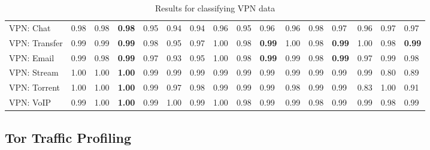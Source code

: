 \begin{table} [ht!]
{\begin{tabular} {|p{2cm}|p{0.7cm}p{0.7cm}p{0.7cm}|p{0.7cm}p{0.7cm}p{0.7cm}|p{0.7cm}p{0.7cm}p{0.7cm}|p{0.7cm}p{0.7cm}p{0.7cm}|p{0.7cm}p{0.7cm}p{0.7cm}|}
VPN: Chat & 0.98 & 0.98 & \textbf{0.98} & 0.95 & 0.94 & 0.94 & 0.96 & 0.95 & 0.96 & 0.96 & 0.98 & 0.97 & 0.96 & 0.97 & 0.97 \\
VPN: Transfer & 0.99 & 0.99 & \textbf{0.99} & 0.98 & 0.95 & 0.97 & 1.00 & 0.98 & \textbf{0.99} & 1.00 & 0.98 & \textbf{0.99} & 1.00 & 0.98 & \textbf{0.99} \\
VPN: Email & 0.99 & 0.98 & \textbf{0.99} & 0.97 & 0.93 & 0.95 & 1.00 & 0.98 & \textbf{0.99} & 0.99 & 0.98 & \textbf{0.99} & 0.97 & 0.99 & 0.98 \\
VPN: Stream & 1.00 & 1.00 & \textbf{1.00} & 0.99 & 0.99 & 0.99 & 0.99 & 0.99 & 0.99 & 0.99 & 0.99 & 0.99 & 0.99 & 0.80 & 0.89 \\
VPN: Torrent & 1.00 & 1.00 & \textbf{1.00} & 0.99 & 0.97 & 0.98 & 0.99 & 0.99 & 0.99 & 0.98 & 0.99 & 0.99 & 0.83 & 1.00 & 0.91 \\
VPN: VoIP & 0.99 & 1.00 & \textbf{1.00} & 0.99 & 1.00 & 0.99 & 1.00 & 0.98 & 0.99 & 0.99 & 0.98 & 0.99 & 0.99 & 0.98 & 0.99 \\
\hline
\end{tabular}}
\label{tab:vpnresults}
\caption{Results for classifying VPN data}
\end{table}

\subsection{Tor Traffic Profiling}


